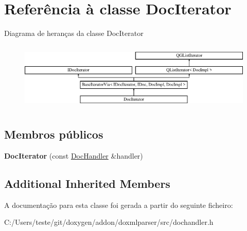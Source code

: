 \hypertarget{class_doc_iterator}{\section{Referência à classe Doc\-Iterator}
\label{class_doc_iterator}
}
Diagrama de heranças da classe Doc\-Iterator\begin{figure}[H]
\begin{center}
\leavevmode
\includegraphics[height=3.294118cm]{class_doc_iterator}
\end{center}
\end{figure}
\subsection*{Membros públicos}
\begin{DoxyCompactItemize}
\item 
\hypertarget{class_doc_iterator_a65c62ef091f3f8f2607235022a9ca709}{{\bfseries Doc\-Iterator} (const \hyperlink{class_doc_handler}{Doc\-Handler} \&handler)}\label{class_doc_iterator_a65c62ef091f3f8f2607235022a9ca709}

\end{DoxyCompactItemize}
\subsection*{Additional Inherited Members}


A documentação para esta classe foi gerada a partir do seguinte ficheiro\-:\begin{DoxyCompactItemize}
\item 
C\-:/\-Users/teste/git/doxygen/addon/doxmlparser/src/dochandler.\-h\end{DoxyCompactItemize}
